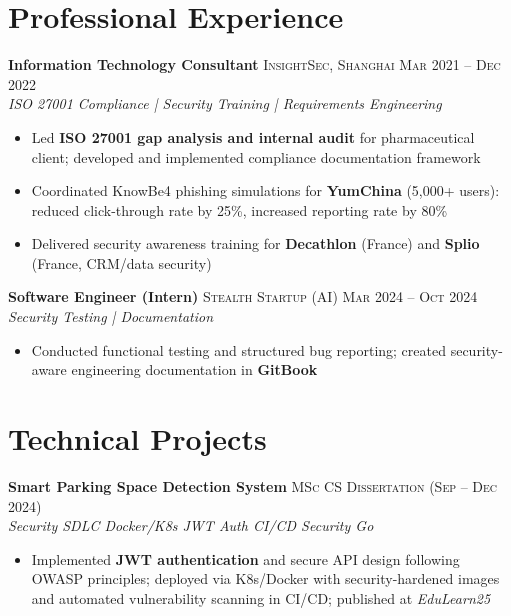 \documentclass{simpleresume}
\begin{document}
\section{Professional Experience}
\noindent\textbf{Information Technology Consultant}
  \hfill{\sffamily\scshape\small\color{secondary}InsightSec, Shanghai}
  \hfill{\sffamily\scshape\small\color{muted}Mar 2021 -- Dec 2022}\\
  {\itshape\color{secondary}ISO 27001 Compliance | Security Training | Requirements Engineering}
\vspace{-0.25mm}
\begin{itemize}
  \item Led \textbf{ISO 27001 gap analysis and internal audit} for pharmaceutical client; developed and implemented compliance documentation framework
  \item Coordinated KnowBe4 phishing simulations for \textbf{YumChina} (5,000+ users): reduced click-through rate by 25\%, increased reporting rate by 80\%
  \item Delivered security awareness training for \textbf{Decathlon} (France) and \textbf{Splio} (France, CRM/data security)
\end{itemize}

\vspace{0.05cm}
\noindent\textbf{Software Engineer (Intern)}
  \hfill{\sffamily\scshape\small\color{secondary}Stealth Startup (AI)}
  \hfill{\sffamily\scshape\small\color{muted}Mar 2024 -- Oct 2024}\\
  {\itshape\color{secondary}Security Testing | Documentation}
\vspace{-0.25mm}
\begin{itemize}
  \item Conducted functional testing and structured bug reporting; created security-aware engineering documentation in \textbf{GitBook}
\end{itemize}

\section{Technical Projects}
\noindent\textbf{Smart Parking Space Detection System}
  \hfill{\sffamily\scshape\small\color{muted}MSc CS Dissertation (Sep -- Dec 2024)}\\
  {\itshape\color{accent}\footnotesize Security SDLC \quad\textbullet\quad Docker/K8s \quad\textbullet\quad JWT Auth \quad\textbullet\quad CI/CD Security \quad\textbullet\quad Go}
\vspace{-0.25mm}
\begin{itemize}
  \item Implemented \textbf{JWT authentication} and secure API design following OWASP principles; deployed via K8s/Docker with security-hardened images and automated vulnerability scanning in CI/CD; published at \textit{EduLearn25}
\end{itemize}
\end{document}
